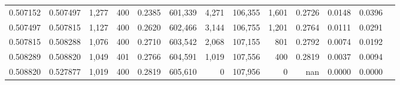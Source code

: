 \begin{tabular}{rrrrrrrrrrrrr}
0.507152 & 0.507497 & 1,277 & 400 &                                     0.2385 & 601,339 &   4,271 & 106,355 &   1,601 & 0.2726 & 0.0148 & 0.0396 \\
0.507497 & 0.507815 & 1,127 & 400 &                                     0.2620 & 602,466 &   3,144 & 106,755 &   1,201 & 0.2764 & 0.0111 & 0.0291 \\
0.507815 & 0.508288 & 1,076 & 400 &                                     0.2710 & 603,542 &   2,068 & 107,155 &     801 & 0.2792 & 0.0074 & 0.0192 \\
0.508289 & 0.508820 & 1,049 & 401 &                                     0.2766 & 604,591 &   1,019 & 107,556 &     400 & 0.2819 & 0.0037 & 0.0094 \\
0.508820 & 0.527877 & 1,019 & 400 &                                     0.2819 & 605,610 &       0 & 107,956 &       0 &    nan & 0.0000 & 0.0000 \\
\bottomrule
\end{tabular}
